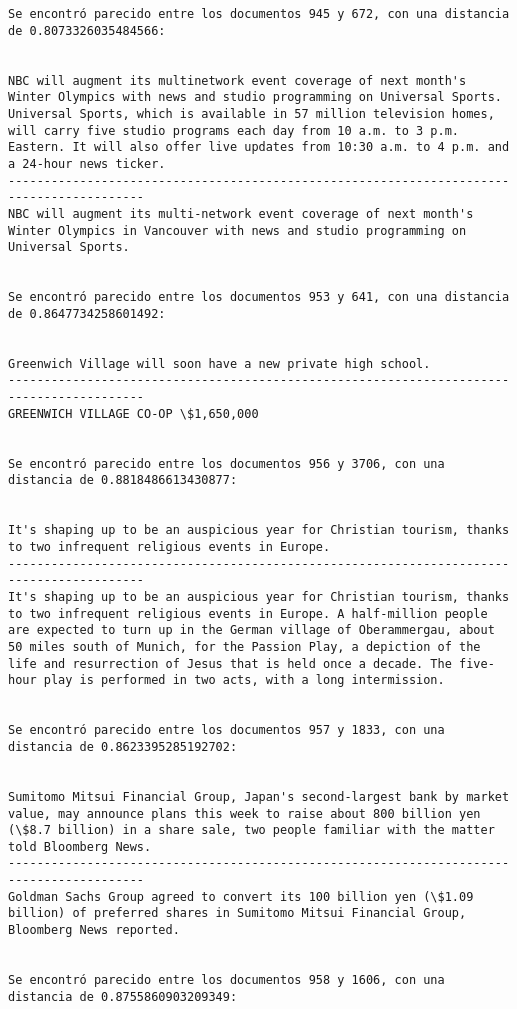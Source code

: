 \documentclass[11pt]{article}
\begin{document}
\begin{Verbatim}[commandchars=\\\{\}]
Se encontró parecido entre los documentos 945 y 672, con una distancia de 0.8073326035484566:


NBC will augment its multinetwork event coverage of next month's Winter Olympics with news and studio programming on Universal Sports. Universal Sports, which is available in 57 million television homes, will carry five studio programs each day from 10 a.m. to 3 p.m. Eastern. It will also offer live updates from 10:30 a.m. to 4 p.m. and a 24-hour news ticker.
-----------------------------------------------------------------------------------------
NBC will augment its multi-network event coverage of next month's Winter Olympics in Vancouver with news and studio programming on Universal Sports.


Se encontró parecido entre los documentos 953 y 641, con una distancia de 0.8647734258601492:


Greenwich Village will soon have a new private high school.
-----------------------------------------------------------------------------------------
GREENWICH VILLAGE CO-OP \$1,650,000


Se encontró parecido entre los documentos 956 y 3706, con una distancia de 0.8818486613430877:


It's shaping up to be an auspicious year for Christian tourism, thanks to two infrequent religious events in Europe.
-----------------------------------------------------------------------------------------
It's shaping up to be an auspicious year for Christian tourism, thanks to two infrequent religious events in Europe. A half-million people are expected to turn up in the German village of Oberammergau, about 50 miles south of Munich, for the Passion Play, a depiction of the life and resurrection of Jesus that is held once a decade. The five-hour play is performed in two acts, with a long intermission.


Se encontró parecido entre los documentos 957 y 1833, con una distancia de 0.8623395285192702:


Sumitomo Mitsui Financial Group, Japan's second-largest bank by market value, may announce plans this week to raise about 800 billion yen (\$8.7 billion) in a share sale, two people familiar with the matter told Bloomberg News.
-----------------------------------------------------------------------------------------
Goldman Sachs Group agreed to convert its 100 billion yen (\$1.09 billion) of preferred shares in Sumitomo Mitsui Financial Group, Bloomberg News reported.


Se encontró parecido entre los documentos 958 y 1606, con una distancia de 0.8755860903209349:



\end{Verbatim}
\end{document}

